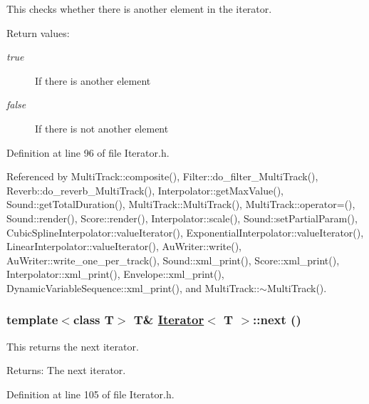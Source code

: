 This checks whether there is another element in the iterator. \begin{Desc}
\item[Return values:]
\begin{description}
\item[{\em true}]If there is another element \item[{\em false}]If there is not another element \end{description}
\end{Desc}


Definition at line 96 of file Iterator.h.

Referenced by Multi\-Track::composite(), Filter::do\_\-filter\_\-Multi\-Track(), Reverb::do\_\-reverb\_\-Multi\-Track(), Interpolator::get\-Max\-Value(), Sound::get\-Total\-Duration(), Multi\-Track::Multi\-Track(), Multi\-Track::operator=(), Sound::render(), Score::render(), Interpolator::scale(), Sound::set\-Partial\-Param(), Cubic\-Spline\-Interpolator::value\-Iterator(), Exponential\-Interpolator::value\-Iterator(), Linear\-Interpolator::value\-Iterator(), Au\-Writer::write(), Au\-Writer::write\_\-one\_\-per\_\-track(), Sound::xml\_\-print(), Score::xml\_\-print(), Interpolator::xml\_\-print(), Envelope::xml\_\-print(), Dynamic\-Variable\-Sequence::xml\_\-print(), and Multi\-Track::$\sim$Multi\-Track().\hypertarget{classIterator_a5}{
\subsubsection[next]{\setlength{\rightskip}{0pt plus 5cm}template$<$class T$>$ T\& \hyperlink{classIterator}{Iterator}$<$ T $>$::next ()}}
\label{classIterator_a5}


This returns the next iterator. \begin{Desc}
\item[Returns:]The next iterator. \end{Desc}


Definition at line 105 of file Iterator.h.


